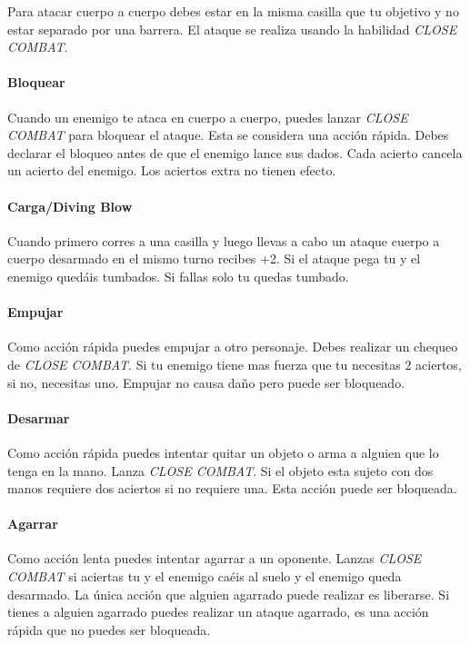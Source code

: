 Para atacar cuerpo a cuerpo debes estar en la misma casilla que tu objetivo y no estar separado por una barrera. El ataque se realiza usando la habilidad \emph{CLOSE COMBAT}. 

\paragraph{Bloquear}
Cuando un enemigo te ataca en cuerpo a cuerpo, puedes lanzar \emph{CLOSE COMBAT} para bloquear el ataque. Esta se considera una acción rápida. Debes declarar el bloqueo antes de que el enemigo lance sus dados. Cada acierto cancela un acierto del enemigo. Los aciertos extra no tienen efecto.

\paragraph{Carga/Diving Blow}
Cuando primero corres a una casilla y luego llevas a cabo un ataque cuerpo a cuerpo desarmado en el mismo turno recibes +2. Si el ataque pega tu y el enemigo quedáis tumbados. Si fallas solo tu quedas tumbado.

\paragraph{Empujar}
Como acción rápida puedes empujar a otro personaje. Debes realizar un chequeo de \emph{CLOSE COMBAT}. Si tu enemigo tiene mas fuerza que tu necesitas 2 aciertos, si no, necesitas uno. Empujar no causa daño pero puede ser bloqueado.

\paragraph{Desarmar}
Como acción rápida puedes intentar quitar un objeto o arma a alguien que lo tenga en la mano. Lanza \emph{CLOSE COMBAT}. Si el objeto esta sujeto con dos manos requiere dos aciertos si no requiere una. Esta acción puede ser bloqueada.

\paragraph{Agarrar}
Como acción lenta puedes intentar agarrar a un oponente. Lanzas \emph{CLOSE COMBAT} si aciertas tu y el enemigo caéis al suelo y el enemigo queda desarmado. La única acción que alguien agarrado puede realizar es liberarse. Si tienes a alguien agarrado puedes realizar un ataque agarrado, es una acción rápida que no puedes ser bloqueada.

